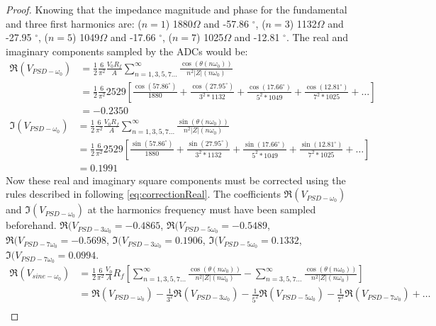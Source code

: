 \begin{proof}
    Knowing that the impedance magnitude and phase for the fundamental and three first harmonics are: ($n=1$) 1880$\Omega$ and -57.86 $^\circ$, ($n=3$) 1132$\Omega$ and -27.95 $^\circ$, ($n=5$) 1049$\Omega$ and -17.66 $^\circ$, ($n=7$) 1025$\Omega$ and -12.81 $^\circ$. The real and imaginary components sampled by the ADCs would be:
    \begin{align*}
       \Re(V_{PSD-\omega_0}) &= \frac{1}{2} \frac{6}{\pi^2} \frac{V_0 R_f}{A} \displaystyle\sum_{n=1,3,5,7...} ^{\infty} \frac{\cos(\theta(n \omega_0))}{n^2\lvert Z \rvert (n \omega_0)}\nonumber\\
        &= \frac{1}{2} \frac{6}{\pi^2} 2529 [\frac{\cos(57.86 ^\circ)}{1880} + \frac{\cos(27.95^\circ)}{3^2 * 1132} + \frac{\cos(17.66 ^\circ)}{5^2 * 1049} + \frac{\cos(12.81 ^\circ)}{7^2 * 1025} + \dots]\nonumber\\
        &= -0.2350 \nonumber
       \end{align*}
     \begin{align*}
       \Im(V_{PSD-\omega_0}) &= \frac{1}{2} \frac{6}{\pi^2} \frac{V_0 R_f}{A} \displaystyle\sum_{n=1,3,5,7...} ^{\infty} \frac{\sin(\theta(n \omega_0))}{n^2\lvert Z \rvert (n \omega_0)}\nonumber\\
        &= \frac{1}{2} \frac{6}{\pi^2} 2529 [\frac{\sin(57.86 ^\circ)}{1880} + \frac{\sin(27.95^\circ)}{3^2 * 1132} + \frac{\sin(17.66 ^\circ)}{5^2 * 1049} + \frac{\sin(12.81 ^\circ)}{7^2 * 1025} + \dots]\nonumber\\
        &= 0.1991\nonumber
    \end{align*}
    Now these real and imaginary square components must be corrected using the rules described in \citep{Subhan2019} following \autoref{eq:correctionReal}. The coefficients $\Re(V_{PSD-\omega_0})$ and $\Im(V_{PSD-\omega_0})$ at the harmonics frequency must have been sampled beforehand. $\Re(V_{PSD-3\omega_0}=-0.4865$, $\Re(V_{PSD-5\omega_0}=-0.5489$, $\Re(V_{PSD-7\omega_0}=-0.5698$, $\Im(V_{PSD-3\omega_0}=0.1906$, $\Im(V_{PSD-5\omega_0}=0.1332$, $\Im(V_{PSD-7\omega_0}=0.0994$. 
    \begin{align*}
       \Re(V_{sine-\omega_0}) &= \frac{1}{2} \frac{6}{\pi^2} \frac{V_0}{A} R_f [ \displaystyle\sum_{n=1,3,5,7...} ^{\infty} \frac{\cos(\theta(n \omega_0))}{n^2\lvert Z \rvert (n \omega_0)} - \displaystyle\sum_{n=3,5,7...} ^{\infty} \frac{\cos(\theta(n \omega_0))}{n^2\lvert Z \rvert (n \omega_0)}]\nonumber\\
       &= \Re(V_{PSD-\omega_0}) - \frac{1}{3^2}\Re(V_{PSD-3\omega_0}) - \frac{1}{5^2}\Re(V_{PSD-5\omega_0}) - \frac{1}{7^2}\Re(V_{PSD-7\omega_0}) + \dots\nonumber\\

\end{align*}
\end{proof}
